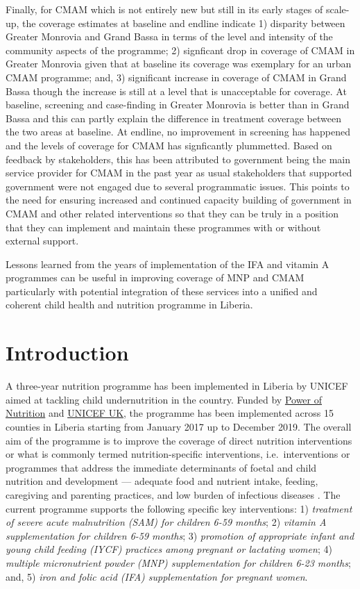 \documentclass[12pt,a4paper]{article}
\begin{document}
Finally, for CMAM which is not entirely new but still in its early stages of scale-up, the coverage estimates at baseline and endline indicate 1) disparity between Greater Monrovia and Grand Bassa in terms of the level and intensity of the community aspects of the programme; 2) signficant drop in coverage of CMAM in Greater Monrovia given that at baseline its coverage was exemplary for an urban CMAM programme; and, 3) significant increase in coverage of CMAM in Grand Bassa though the increase is still at a level that is unacceptable for coverage. At baseline, screening and case-finding in Greater Monrovia is better than in Grand Bassa and this can partly explain the difference in treatment coverage between the two areas at baseline. At endline, no improvement in screening has happened and the levels of coverage for CMAM has signficantly plummetted. Based on feedback by stakeholders, this has been attributed to government being the main service provider for CMAM in the past year as usual stakeholders that supported government were not engaged due to several programmatic issues. This points to the need for ensuring increased and continued capacity building of government in CMAM and other related interventions so that they can be truly in a position that they can implement and maintain these programmes with or without external support.

Lessons learned from the years of implementation of the IFA and vitamin A programmes can be useful in improving coverage of MNP and CMAM particularly with potential integration of these services into a unified and coherent child health and nutrition programme in Liberia.

\newpage

\hypertarget{intro}{%
\section{Introduction}\label{intro}}

A three-year nutrition programme has been implemented in Liberia by UNICEF aimed at tackling child undernutrition in the country. Funded by \href{http://www.powerofnutrition.org}{Power of Nutrition} and \href{https://www.unicef.org.uk}{UNICEF UK}, the programme has been implemented across 15 counties in Liberia starting from January 2017 up to December 2019. The overall aim of the programme is to improve the coverage of direct nutrition interventions or what is commonly termed nutrition-specific interventions, i.e.~interventions or programmes that address the immediate determinants of foetal and child nutrition and development --- adequate food and nutrient intake, feeding, caregiving and parenting practices, and low burden of infectious diseases \citep{Bhutta:2013ks, Ruel:2013kr}. The current programme supports the following specific key interventions: 1) \emph{treatment of severe acute malnutrition (SAM) for children 6-59 months}; 2) \emph{vitamin A supplementation for children 6-59 months}; 3) \emph{promotion of appropriate infant and young child feeding (IYCF) practices among pregnant or lactating women}; 4) \emph{multiple micronutrient powder (MNP) supplementation for children 6-23 months}; and, 5) \emph{iron and folic acid (IFA) supplementation for pregnant women}.
\end{document}
